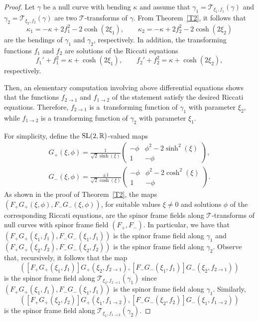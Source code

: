 \documentclass[10pt,a4paper]{amsart}
\numberwithin{equation}{section}
\def\bending{\kappa}
\def\R{\mathbb{R}}
\def\SL{{\rm SL}(2,\R)}
\begin{document}
\begin{proof} Let $\gamma$ be a null curve with bending $\bending$ and assume that $\gamma_1=\mathcal{T}_{\xi_1,f_1}(\gamma)$ and $\gamma_2=\mathcal{T}_{\xi_2,f_2}(\gamma)$ are two $\mathcal{T}$-transforms of $\gamma$. From Theorem~\ref{T2}, it follows that
	\begin{equation*}
		\bending_1=-\bending+2f_1^2-2\cosh(2\xi_1),\qquad
		\bending_2=-\bending+2f_2^2-2\cosh(2\xi_2)
	\end{equation*}
	are the bendings of $\gamma_1$ and $\gamma_2$, respectively. In addition, the transforming functions $f_1$ and $f_2$ are solutions of the Riccati equations
	\begin{equation*}
		f_1'+f_1^2=\bending+\cosh(2\xi_1),\qquad
		f_2'+f_2^2=\bending+\cosh(2\xi_2),
	\end{equation*}	
	respectively.
	
	Then, an elementary computation involving above differential equations shows that the functions $f_{2\to1}$ and $f_{1\to 2}$ of the statement satisfy the desired Riccati equations. Therefore, $f_{2\to 1}$ is a~transforming function of $\gamma_1$ with parameter $\xi_2$, while $f_{1\to 2}$ is a transforming function of $\gamma_2$ with parameter $\xi_1$.
	
	For simplicity, define the $\SL$-valued maps
	\begin{gather*}
		G_+(\xi,\phi)=\frac{1}{\sqrt{2}\sinh(\xi)}\begin{pmatrix} -\phi & \phi^2-2\sinh^2(\xi) \\ 1 & -\phi \end{pmatrix},\\
		G_-(\xi,\phi)=\frac{\pm1}{\sqrt{2}\cosh(\xi)}\begin{pmatrix} -\phi & \phi^2-2\cosh^2(\xi) \\ 1 & -\phi \end{pmatrix}.
	\end{gather*}
	As shown in the proof of Theorem~\ref{T2}, the maps $(F_+G_+(\xi,\phi),F_-G_-(\xi,\phi))$, for suitable values $\xi\neq 0$ and solutions $\phi$ of the corresponding Riccati equations, are the spinor frame fields along $\mathcal{T}$-transforms of null curves with spinor frame field $(F_+,F_-)$. In particular, we have that $(F_+G_+(\xi_1,f_1),F_-G_-(\xi_1,f_1))$ is the spinor frame field along $\gamma_1$ and $(F_+G_+(\xi_2,f_2),F_-G_-(\xi_2,f_2))$ is the spinor frame field along $\gamma_2$. Observe that, recursively, it follows that the map
	\begin{equation*}([F_+G_+(\xi_1,f_1)]G_+(\xi_2,f_{2\to 1}),[F_-G_-(\xi_1,f_1)]G_-(\xi_2,f_{2\to 1}))\end{equation*}
	is the spinor frame field along $\mathcal{T}_{\xi_2,f_{2\to 1}}(\gamma_1)$ since $(F_+G_+(\xi_1,f_1),F_-G_-(\xi_1,f_1))$ is the spinor frame field along $\gamma_1$. Similarly,
	\begin{equation*}([F_+G_+(\xi_2,f_2)]G_+(\xi_1,f_{1\to 2}),[F_-G_-(\xi_2,f_2)]G_-(\xi_1,f_{1\to 2}))\end{equation*}
	is the spinor frame field along $\mathcal{T}_{\xi_1,f_{1\to 2}}(\gamma_2)$.
	

\end{proof}
\end{document}
